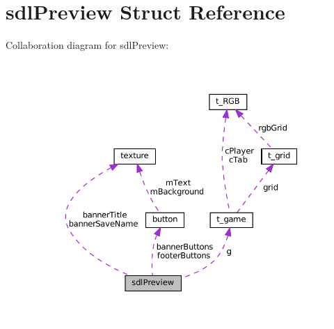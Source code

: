 \hypertarget{structsdl_preview}{}\section{sdl\+Preview Struct Reference}
\label{structsdl_preview}


Collaboration diagram for sdl\+Preview\+:
\nopagebreak
\begin{figure}[H]
\begin{center}
\leavevmode
\includegraphics[width=350pt]{structsdl_preview__coll__graph}
\end{center}
\end{figure}
